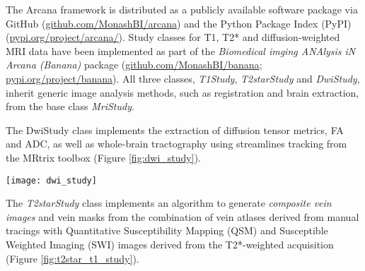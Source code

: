 \documentclass[smallextended]{svjour3}       %
\begin{document}
The Arcana framework is distributed as a publicly available software
package via GitHub (\url{github.com/MonashBI/arcana}) and the
Python Package Index (PyPI) (\url{pypi.org/project/arcana/}).
Study classes for T1, T2* and diffusion-weighted MRI data have been
implemented as part of the \emph{Biomedical imging ANAlysis iN Arcana (Banana)} package
(\url{github.com/MonashBI/banana}; \url{pypi.org/project/banana}).
All three classes, \emph{T1Study}, \emph{T2starStudy} and
\emph{DwiStudy}, inherit generic image analysis methods, such as
registration and brain extraction, from the base class \emph{MriStudy}.

The DwiStudy class implements the extraction of diffusion tensor metrics,
FA and ADC, as well as whole-brain tractography using streamlines tracking from the MRtrix
toolbox \citep{tournier_improved_2010,tournier_mrtrix:_2012} (Figure \ref{fig:dwi_study}).

\begin{figure*}
	\centering
    \texttt{[image: dwi\_study]}
  \caption{Example diffusion-weighted MRI (DWI) study, which can derive
tensor metrics, fractional anisotropy (FA) and apparent diffusion
coefficient (ADC) as well as streamlines fibre tracking. Blue boxes:
acquired (input) data (filesets or fields). Green boxes: derivatives.
Orange ovals: pipelines. Blue and green arrows: acquired and derived
inputs to pipelines, respectively. Orange arrows: outputs of pipelines.
The DWI magnitude image is preprocessed for motion correction and EPI
distortions masked and bias corrected. From the bias corrected image two
branches of analysis can be performed using the same intermediate
derivatives: FA and ADC and/or streamlines fibre tracking.}
\label{fig:dwi_study}
\end{figure*}

The \emph{T2starStudy} class implements an algorithm to generate
\emph{composite vein images} \citep{ward_combining_2018} and
vein masks \citep{ward_vein_2017} from the combination of
vein atlases derived from manual tracings with Quantitative
Susceptibility Mapping (QSM) and Susceptible Weighted Imaging (SWI)
images derived from the T2*-weighted acquisition (Figure \ref{fig:t2star_t1_study}).
\end{document}
